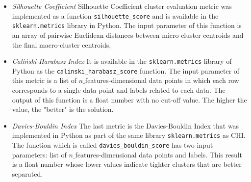 \begin{itemize}
    

\item\textit{Silhouette Coefficient}
Silhouette Coefficient cluster evaluation metric was implemented as a function \texttt{silhouette\_score} and is available in the \texttt{sklearn.metrics} library in Python.  The input parameter of this function is an array of pairwise Euclidean distances between micro-cluster centroids and the final macro-cluster centroids, %





\item\textit{Caliński-Harabasz Index}
It is available in the \texttt{sklearn.metrics} library of Python as the \texttt{calinski\_harabasz\_score} function. The input parameter of this metric is a list of $n\_$features-dimensional data points in which each row corresponds to a single data point and labels related to each data. The output of this function is a float number with no cut-off value. The higher the value, the "better" is the solution.




\item\textit{Davies-Bouldin Index}
The last metric is the Davies-Bouldin Index that was implemented in Python as part of the same library \texttt{sklearn.metrics} as CHI. The function which is called \texttt{davies\_bouldin\_score} has two input parameters: list of $n\_$features-dimensional data points and labels. This result is a float number whose lower values indicate tighter clusters that are better separated.




\end{itemize}


